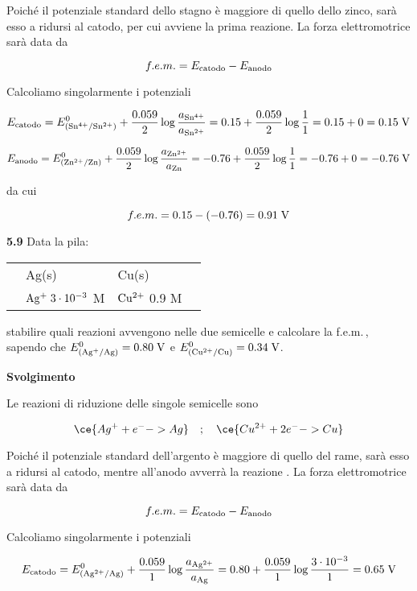 Poiché il potenziale standard dello stagno è maggiore di quello dello zinco, sarà esso a ridursi al catodo, per cui avviene la prima reazione. La forza elettromotrice sarà data da

$$f.e.m. = E_{\rm catodo} - E_{\rm anodo}$$

Calcoliamo singolarmente i potenziali

$$E_{\rm catodo}
=E^0_{(\rm Sn^{4+}/Sn^{2+})} + \frac{0.059}{2} \log \frac{a_{\rm Sn^{4+}}}{a_{\rm Sn^{2+}}}
=0.15 + \frac{0.059}{2} \log \frac{1}{1}
=0.15 + 0 = 0.15 \; \rm V$$

$$E_{\rm anodo} = E^0_{(\rm Zn^{2+}/Zn)} + \frac{0.059}{2} \log \frac{a_{\rm Zn^{2+}}}{a_{\rm Zn}}
=-0.76 + \frac{0.059}{2} \log \frac{1}{1}
= -0.76 + 0=-0.76 \; \rm V$$

da cui

$$f.e.m.=0.15 - (-0.76) = 0.91 \; \rm V$$

\vspace{0.2cm}\textbf{5.9} Data la pila:

\begin{center}
    \begin{tabular}{p{0.6cm}|p{3cm}||p{3cm}|p{1cm}}
        & Ag(s) & Cu(s) & \\[0.5ex]
        & $\rm Ag^{+}\;3 \cdot 10^{-3}$ M & $\rm Cu^{2+}$ 0.9 M&\\[0.5ex]
    \end{tabular}
\end{center}

stabilire quali reazioni avvengono nelle due semicelle e calcolare la f.e.m.\,, sapendo che $E^0_{(\rm Ag^{+}/Ag)}=0.80 \; \rm V$ e $E^0_{(\rm Cu^{2+}/Cu)}=0.34 \; \rm V$.

\vspace{0.2cm}\large\textbf{Svolgimento}\normalsize

\vspace{0.2cm}Le reazioni di riduzione delle singole semicelle sono

$$\ce{Ag^{+} + e^- -> Ag}
\quad;\quad
\ce{Cu^{2+} + 2 e^- -> Cu}$$

Poiché il potenziale standard dell'argento è maggiore di quello del rame, sarà esso a ridursi al catodo, mentre all'anodo avverrà la reazione . La forza elettromotrice sarà data da

$$f.e.m. = E_{\rm catodo} - E_{\rm anodo}$$

Calcoliamo singolarmente i potenziali

$$E_{\rm catodo}
=E^0_{(\rm Ag^{2+}/Ag)} + \frac{0.059}{1} \log \frac{a_{\rm Ag^{2+}}}{a_{\rm Ag}}
=0.80 + \frac{0.059}{1} \log \frac{3 \cdot 10^{-3}}{1}
=0.65 \; \rm V$$

